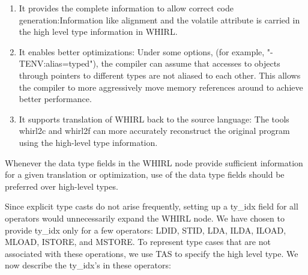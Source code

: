 \documentclass{article}
\begin{document}
\begin{enumerate}
\item It provides
the complete information to allow correct code generation:Information
like alignment and the volatile attribute is carried in the high
level type information in WHIRL. 
\item It enables better optimizations:
Under some options, (for example, "-TENV:alias=typed"), the compiler
can assume that accesses to objects through pointers to different
types are not aliased to each other. This allows the compiler to
more aggressively move memory references around to achieve better
performance. 
\item It supports translation of WHIRL back to the source
language: The tools whirl2c and whirl2f can more accurately reconstruct
the original program using the high-level type information. 
\end{enumerate}

Whenever the data type fields in the WHIRL node provide sufficient information
for a given translation or optimization, use of the data type fields
should be preferred over high-level types. 

Since explicit type casts do not arise frequently, setting up a
ty\_idx field for all operators would unnecessarily expand the WHIRL
node. We have chosen to provide ty\_idx only for a few operators:
LDID, STID, LDA, ILDA, ILOAD, MLOAD, ISTORE, and MSTORE. To represent
type cases that are not associated with these operations, we use
TAS to specify the high level type. We now describe the ty\_idx's in
these operators:
\end{document}
